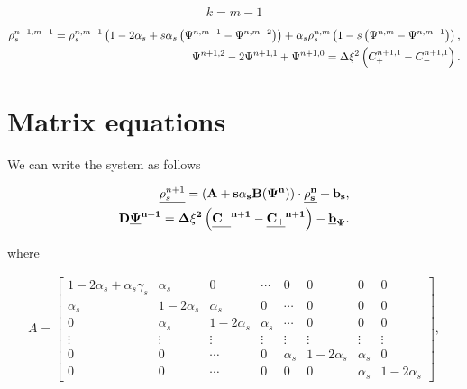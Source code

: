 $$ k = m-1 $$

\begin{align}
    \rho_s^{n+1, m-1} = \rho_s^{n,m-1} \left({1 - 2 \alpha_s + s \alpha_s \left({\Psi^{n, m-1} - \Psi^{n, m-2}}\right)}\right) + \alpha_s \rho_s^{n, m} \left({1 - s \left({\Psi^{n,m} - \Psi^{n,m-1}}\right)}\right),\\
    \Psi^{n+1, 2} - 2\Psi^{n+1,1} + \Psi^{n+1, 0} = \Delta \xi^2 \left({C_+^{n+1, 1} - C_-^{n+1, 1}}\right).  
\end{align}

\section{Matrix equations}

We can write the system as follows

\begin{align}
\underline{\rho_s^{n+1}} = (\bf{A} + s\alpha_s\bf{B}(\Psi^{n}) ) \cdot \underline{\rho_s^{n}} + \bf{b_s},\\
\bf{D} \underline{\Psi}^{n+1} = \Delta \xi ^2\left({\underline{C_-}^{n+1} - \underline{C_+}^{n+1}}\right)- \underline{b}_{\Psi}.
\end{align}


where

\begin{align}
A = \begin{bmatrix}
    1 - 2 \alpha_s + \alpha_s \gamma_s   &  \alpha_s   & 0  &   \cdots & 0   &   0   &   0   &   0 \\
    \alpha_s    &   1 - 2 \alpha_s       &  \alpha_s   & 0  & \cdots   & 0   &   0   &   0 \\
    0         & \alpha_s               &  1 - 2 \alpha_s  & \alpha_s   & \cdots   &   0   &   0   &   0 \\
    \vdots    &  \vdots              &\vdots          &  \vdots  & \vdots   &\vdots & \vdots & \vdots \\ 
    0         &  0                   &  \cdots        &  0       &  \alpha_s    &  1-2\alpha_s &    \alpha_s   &    0 \\
0         &  0                   &  \cdots        &  0           &  0         &     0      &  \alpha_s    &  1-2\alpha_s 
\end{bmatrix},
\end{align}


